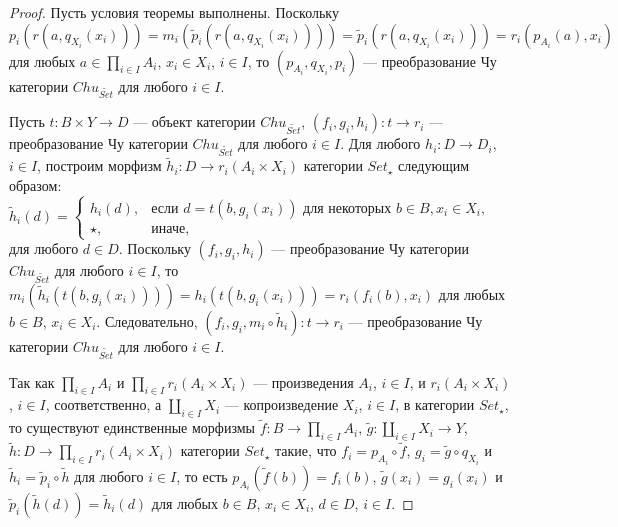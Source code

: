 \documentclass[a4paper,12pt]{article}
\begin{document}
\begin{proof}
    Пусть условия теоремы выполнены. Поскольку $p_i(r(a,q_{X_i}(x_i))) = m_i(\tilde{p}_i(r(a,q_{X_i}(x_i)))) = \tilde{p}_i(r(a,q_{X_i}(x_i))) = r_i(p_{A_i}(a),x_i)$ для любых $a \in \prod_{i \in I} A_i$, $x_i \in X_i$, $i \in I$, то $(p_{A_i},q_{X_i},p_i)$ --- преобразование Чу категории $Chu_{\widetilde{Set}}$ для любого $i \in I$.

    Пусть $t: B \times Y \to D$ --- объект категории $Chu_{\widetilde{Set}}$, $(f_i,g_i,h_i): t \to r_i$ --- преобразование Чу категории $Chu_{\widetilde{Set}}$ для любого $i \in I$. Для любого $h_i: D \to D_i$, $i \in I$, построим морфизм $\tilde{h}_i: D \to r_i(A_i \times X_i)$ категории $Set_\star$ следующим образом: $\tilde{h}_i(d) = 
    \begin{cases}
        h_i(d),& \text{если } d = t(b,g_i(x_i)) \text{ для некоторых } b \in B, x_i \in X_i,\\
        \star,& \text{иначе},
    \end{cases}$
    для любого $d \in D$. Поскольку $(f_i,g_i,h_i)$ --- преобразование Чу категории $Chu_{\widetilde{Set}}$ для любого $i \in I$, то $m_i(\tilde{h}_i(t(b,g_i(x_i)))) = h_i(t(b,g_i(x_i))) = r_i(f_i(b),x_i)$ для любых $b \in B$, $x_i \in X_i$. Следовательно, $(f_i,g_i,m_i \circ \tilde{h}_i): t \to r_i$ --- преобразование Чу категории $Chu_{\widetilde{Set}}$ для любого $i \in I$.

    Так как $\prod_{i \in I} A_i$ и $\prod_{i \in I} r_i(A_i \times X_i)$ --- произведения $A_i$, $ i \in I$, и $r_i(A_i \times X_i)$, $i \in I$, соответственно, а $\coprod_{i \in I} X_i$ --- копроизведение $X_i$, $i \in I$, в категории $Set_{\star}$, то существуют единственные морфизмы $\tilde{f}: B \to \prod_{i \in I} A_i$, $\tilde{g}: \coprod_{i \in I} X_i \to Y$, $\tilde{h}: D \to \prod_{i \in I} r_i(A_i \times X_i)$ категории $Set_{\star}$ такие, что $f_i = p_{A_i} \circ \tilde{f}$, $g_i = \tilde{g} \circ q_{X_i}$ и $\tilde{h}_i = \tilde{p}_i \circ \tilde{h}$ для любого $i \in I$, то есть $p_{A_i}(\tilde{f}(b)) = f_i(b)$, $\tilde{g}(x_i) = g_i(x_i)$ и $\tilde{p}_i(\tilde{h}(d)) = \tilde{h}_i(d)$ для любых $b \in  B$, $x_i \in X_i$, $d \in D$, $i \in I$.


\end{proof}
\end{document}
